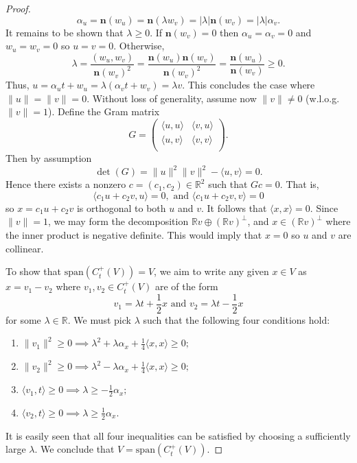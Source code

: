 \documentclass[a4paper,11pt]{article}
\numberwithin{equation}{section}
\theoremstyle{definition}
\theoremstyle{plain}
\newcommand{\R}{\mathbb R}
\newcommand{\spn}{\mathrm{span}}
\newcommand{\inner}[2]{\langle #1, #2 \rangle}
\newcommand{\norm}[1]{\| #1\|}
\begin{document}
\begin{proof}
    $$\alpha_{u} = \mathbf{n}(w_{u}) = \mathbf{n}(\lambda w_{v}) = |\lambda|\mathbf{n}(w_{v}) = |\lambda|\alpha_{v}.$$
    It remains to be shown that $\lambda \geq 0$. If $\mathbf{n}(w_{v}) = 0$ then $\alpha_{u} = \alpha_{v} = 0$ and $w_{u} = w_{v} = 0$ so $u = v = 0$. Otherwise,
    $$\lambda = \frac{(w_{u}, w_{v})}{\mathbf{n}({w_{v}})^{2}} = \frac{\mathbf{n}(w_{u})\mathbf{n}({w_{v}})}{\mathbf{n}({w_{v}})^{2}} = \frac{\mathbf{n}({w_{u}})}{\mathbf{n}({w_{v}})} \geq 0.$$
    Thus, $u = \alpha_u t + w_u = \lambda (\alpha_v t + w_v) = \lambda v$. This concludes the case where $\norm{u} = \norm{v} = 0$. Without loss of generality, assume now $\norm{v} \neq 0$ (w.l.o.g. $\norm{v} = 1$). Define the Gram matrix
    $$G = \begin{pmatrix}
        \inner{u}{u} & \inner{v}{u} \\
        \inner{u}{v} & \inner{v}{v} \\
    \end{pmatrix}.$$
    Then by assumption
    $$\det(G) = \norm{u}^{2}\norm{v}^{2} - \inner{u}{v} = 0.$$
    Hence there exists a nonzero $c = (c_{1}, c_{2}) \in \R^{2}$ such that $Gc = 0$. That is,
    $$\inner{c_{1}u +c_{2}v}{u} = 0, \text{ and }\inner{c_{1}u + c_{2}v}{v} = 0$$
    so $x = c_{1}u + c_{2}v$ is orthogonal to both $u$ and $v$. It follows that $\inner{x}{x} = 0$. Since $\norm{v} = 1$,  we may form the decomposition $\R v \oplus (\R v)^{\perp}$, and $x \in (\R v)^{\perp}$ where the inner product is negative definite. This would imply that $x = 0$ so $u$ and $v$ are collinear.
        
    To show that $\spn(C_{t}^{+}(V)) = V$, we aim to write any given $x \in V$ as $x = v_{1} - v_{2}$ where $v_{1}, v_2 \in C_{t}^{+}(V)$ are of the form
    $$v_{1} = \lambda t + \frac{1}{2}x \text{ and } v_{2} = \lambda t - \frac{1}{2}x$$
    for some $\lambda \in \R$. We must pick $\lambda$ such that the following four conditions hold:
    \begin{enumerate}
        \item $\norm{v_{1}}^{2} \geq 0 \implies \lambda^{2} + \lambda \alpha_{x} + \frac{1}{4}\inner{x}{x} \geq 0;$
        \item $\norm{v_{2}}^{2} \geq 0 \implies \lambda^{2} - \lambda \alpha_{x} + \frac{1}{4}\inner{x}{x} \geq 0;$
        \item $\inner{v_{1}}{t} \geq 0 \implies \lambda \geq -\frac{1}{2}\alpha_{x};$
        \item $\inner{v_{2}}{t} \geq 0 \implies \lambda \geq \frac{1}{2}\alpha_{x}.$
    \end{enumerate}
    It is easily seen that all four inequalities can be satisfied by choosing a sufficiently large $\lambda$. We conclude that $V = \spn(C_t^+(V))$.
\end{proof}
\end{document}
